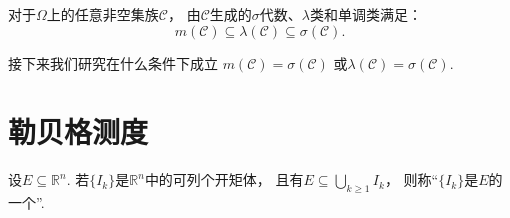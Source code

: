 \begin{proposition}
对于\(\Omega\)上的任意非空集族\(\mathcal{C}\)，
由\(\mathcal{C}\)生成的\(\sigma\)代数、\(\lambda\)类和单调类满足：\begin{equation*}
	m(\mathcal{C})
	\subseteq \lambda(\mathcal{C})
	\subseteq \sigma(\mathcal{C}).
\end{equation*}
\end{proposition}

接下来我们研究在什么条件下成立
\(m(\mathcal{C}) = \sigma(\mathcal{C})\)
或\(\lambda(\mathcal{C}) = \sigma(\mathcal{C})\).

\chapter{勒贝格测度}
\begin{definition}
设\(E \subseteq \mathbb{R}^n\).
若\(\{I_k\}\)是\(\mathbb{R}^n\)中的可列个开矩体，
且有\(E \subseteq \bigcup_{k\geq1} I_k\)，
则称“\(\{I_k\}\)是\(E\)的一个”.
\end{definition}


